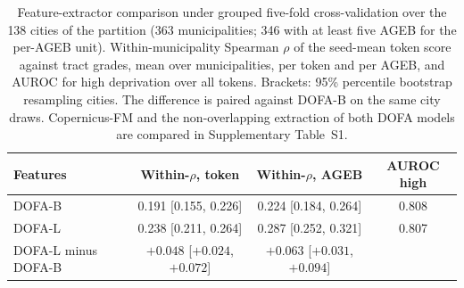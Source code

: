 \begin{table}[htbp]
\centering
\caption{Feature-extractor comparison under grouped five-fold cross-validation over the 138 cities of the partition (363 municipalities; 346 with at least five AGEB for the per-AGEB unit). Within-municipality Spearman $\rho$ of the seed-mean token score against tract grades, mean over municipalities, per token and per AGEB, and AUROC for high deprivation over all tokens. Brackets: 95\% percentile bootstrap resampling cities. The difference is paired against DOFA-B on the same city draws. Copernicus-FM and the non-overlapping extraction of both DOFA models are compared in Supplementary Table~S1.}
\small
\begin{tabular}{lccc}
\toprule
Features & Within-$\rho$, token & Within-$\rho$, AGEB & AUROC high\\
\midrule
DOFA-B & 0.191 [0.155, 0.226] & 0.224 [0.184, 0.264] & 0.808\\
DOFA-L & 0.238 [0.211, 0.264] & 0.287 [0.252, 0.321] & 0.807\\
\midrule
DOFA-L minus DOFA-B & $+0.048$ [$+0.024$, $+0.072$] & $+0.063$ [$+0.031$, $+0.094$] & \\
\bottomrule
\end{tabular}
\label{tab:backbone}
\end{table}

